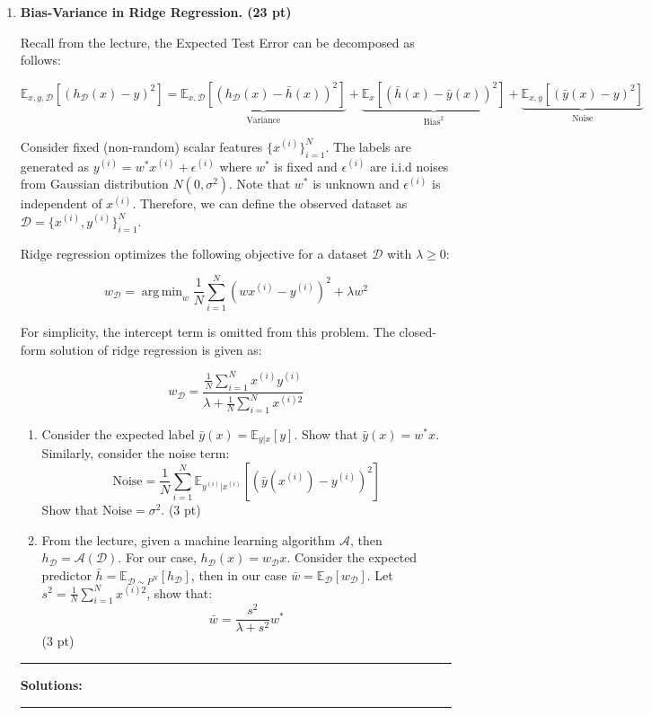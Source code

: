 \documentclass{article}
\DeclareMathOperator*{\argmin}{arg\,min}
\theoremstyle{definition}
\theoremstyle{remark}
\newenvironment{Q}
    {%
      \clearpage
      \item
    }
    {%
      \phantom{s}
      \bigskip
    \hrule
    \vspace{1em}
      \textbf{Solutions: } \\
    \hrule
    }
\begin{document}
\begin{enumerate}[font={\Large\bfseries},left=0pt]


	\begin{Q}

		\textbf{\Large Bias-Variance in Ridge Regression. (23 pt)}

		Recall from the lecture, the Expected Test Error can be decomposed as follows:

		$$
			\mathbb{E}_{x, y, \mathcal{D}}[(h_{\mathcal{D}}(x) - y )^2] = \underbrace{\mathbb{E}_{x, \mathcal{D}}[(h_{\mathcal{D}}(x) - \bar{h}(x))^2]}_{\text{Variance}} + \underbrace{\mathbb{E}_{x}[(\bar{h}(x)-\bar{y}(x))^2]}_{\text{Bias}^2} + \underbrace{\mathbb{E}_{x, y}[(\bar{y}(x)-y)^2]}_{\text{Noise}}
		$$

		Consider fixed (non-random) scalar features $\{x^{(i)}\}_{i=1}^N$. The labels are generated as $y^{(i)}=w^* x^{(i)}+\epsilon^{(i)}$ where $w^{*}$ is fixed and $\epsilon^{(i)}$ are i.i.d noises from Gaussian distribution $N(0,\sigma^2)$. Note that $w^{*}$ is unknown and $\epsilon^{(i)}$ is independent of $x^{(i)}$. Therefore, we can define the observed dataset as $\mathcal{D} = \{x^{(i)}, y^{(i)}\}_{i=1}^N$.

		Ridge regression optimizes the following objective for a dataset $\mathcal{D}$ with $\lambda \geq 0$:

		$$
			w_{\mathcal{D}} = \argmin_w \frac{1}{N} \sum_{i=1}^N (wx^{(i)}-y^{(i)})^2 + \lambda w^2
		$$

		For simplicity, the intercept term is omitted from this problem. The closed-form solution of ridge regression is given as:

		$$
			w_{\mathcal{D}} = \frac{\frac{1}{N}\sum_{i=1}^N x^{(i)} y^{(i)}}{\lambda + \frac{1}{N} \sum_{i=1}^N x^{(i)2}}
		$$

		\begin{enumerate}
			\item Consider the expected label $\bar{{y}}(x) = \mathbb{E}_{y|x}[y]$. Show that $\bar{{y}}(x) = w^{*}x$. Similarly, consider the noise term:
			      $$
				      \text{Noise} = \frac{1}{N} \sum_{i=1}^N \mathbb{E}_{y^{(i)}|x^{(i)}}[(\bar{y}(x^{(i)})-y^{(i)})^2]
			      $$
			      Show that $\text{Noise}=\sigma^2$. (3 pt)

			\item From the lecture, given a machine learning algorithm $\mathcal{A}$, then $h_{\mathcal{D}}=\mathcal{A}(\mathcal{D})$. For our case, $h_{\mathcal{D}}(x) = w_{\mathcal{D}}x$. Consider the expected predictor $\bar{h} = \mathbb{E}_{\mathcal{D}\sim P^{N}} \left[h_{\mathcal{D}}\right]$, then in our case $\bar{w} =  \mathbb{E}_{\mathcal{D}} [w_{\mathcal{D}}]$. Let $s^2 = \frac{1}{N}\sum_{i=1}^N x^{(i)2}$, show that:
			      $$
				      \bar{w} = \frac{s^2}{\lambda + s^2} w^{*}
			      $$
			      (3 pt)


\end{enumerate}
\end{Q}
\end{enumerate}
\end{document}
